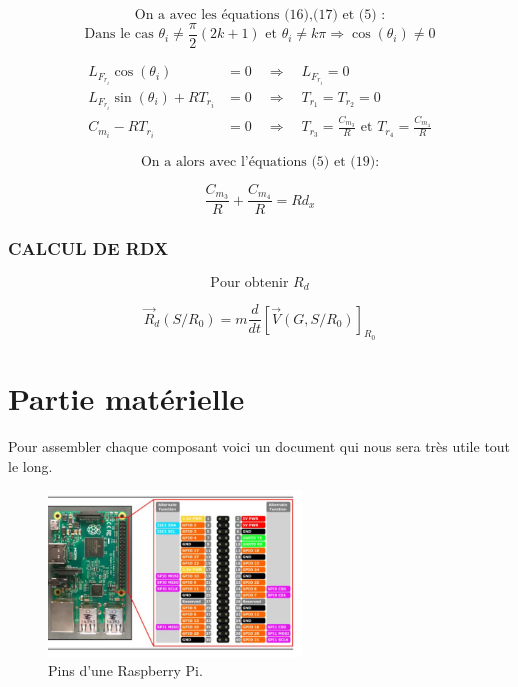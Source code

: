 \documentclass[a4paper,12pt]{report}  %
\begin{document}
$$
\text{On a avec les équations (16),(17) et (5) :}
$$
$$
\text{Dans le cas } \theta_i \neq \frac{\pi}{2}(2k+1)\text{ et } \theta_i \neq k\pi 
\Rightarrow \cos(\theta_i) \neq 0
$$


\begin{align}
	L_{F_{r_i}} \cos(\theta_i) &= 0 \quad \Rightarrow \quad L_{F_{r_i}} = 0 \\
	L_{F_{r_i}} \sin(\theta_i) + R T_{r_i} &= 0 \quad \Rightarrow \quad T_{r_1} = T_{r_2} = 0 \\
	C_{m_i} - R T_{r_i} &= 0 \quad \Rightarrow \quad T_{r_3} = \frac{C_{m_3}}{R} \text{ et } T_{r_4} = \frac{C_{m_4}}{R}
\end{align}

$$
\text{On a alors avec l'équations (5) et (19):}
$$


$$
\frac{C_{m_3}}{R} + \frac{C_{m_4}}{R} = Rd_x 
$$






\subsubsection{CALCUL DE RDX}

$$
\text{Pour obtenir } R_d
$$

$$
\vec{R}_d(S/R_0) = m \frac{d}{dt} [ \vec{V}(G,S/R_0) ]_{R_0}
$$






\pagebreak
\section{Partie matérielle}
Pour assembler chaque composant voici un document qui nous sera très utile tout le long. 

\begin{figure}[H]
	\centering
	\includegraphics[width=0.6\textwidth]{./attachments/raspberry_pi_pin_map.jpg}
	\caption{Pins d'une Raspberry Pi. }
\end{figure}
\end{document}
